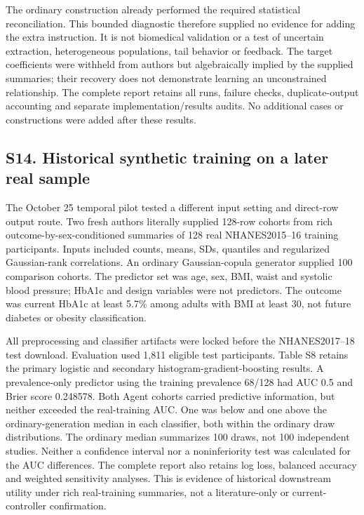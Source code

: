 \documentclass[11pt,letterpaper]{article}
\begin{document}
The ordinary construction already performed the required statistical reconciliation. This bounded diagnostic therefore supplied no evidence for adding the extra instruction. It is not biomedical validation or a test of uncertain extraction, heterogeneous populations, tail behavior or feedback. The target coefficients were withheld from authors but algebraically implied by the supplied summaries; their recovery does not demonstrate learning an unconstrained relationship. The complete report retains all runs, failure checks, duplicate-output accounting and separate implementation/\allowbreak{}results audits. No additional cases or constructions were added after these results.


\subsection*{S14. Historical synthetic training on a later real sample}

The October 25 temporal pilot tested a different input setting and direct-row output route. Two fresh authors literally supplied 128-row cohorts from rich outcome-by-sex-conditioned summaries of 128 real NHANES2015–\allowbreak{}16 training participants. Inputs included counts, means, SDs, quantiles and regularized Gaussian-rank correlations. An ordinary Gaussian-copula generator supplied 100 comparison cohorts. The predictor set was age, sex, BMI, waist and systolic blood pressure; HbA1c and design variables were not predictors. The outcome was current HbA1c at least 5.7\% among adults with BMI at least 30, not future diabetes or obesity classification.


All preprocessing and classifier artifacts were locked before the NHANES2017–\allowbreak{}18 test download. Evaluation used 1,811 eligible test participants. Table S8 retains the primary logistic and secondary histogram-gradient-boosting results. A prevalence-only predictor using the training prevalence 68/\allowbreak{}128 had AUC 0.5 and Brier score 0.248578. Both Agent cohorts carried predictive information, but neither exceeded the real-training AUC. One was below and one above the ordinary-generation median in each classifier, both within the ordinary draw distributions. The ordinary median summarizes 100 draws, not 100 independent studies. Neither a confidence interval nor a noninferiority test was calculated for the AUC differences. The complete report also retains log loss, balanced accuracy and weighted sensitivity analyses. This is evidence of historical downstream utility under rich real-training summaries, not a literature-only or current-controller confirmation.
\end{document}
